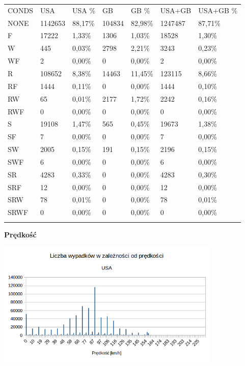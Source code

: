 \begin{longtable}[c]{@{}lllllll@{}}
\toprule\addlinespace
CONDS & USA & USA \% & GB & GB \% & USA+GB & USA+GB \%
\\\addlinespace
\midrule\endhead
NONE & 1142653 & 88,17\% & 104834 & 82,98\% & 1247487 & 87,71\%
\\\addlinespace
F & 17222 & 1,33\% & 1306 & 1,03\% & 18528 & 1,30\%
\\\addlinespace
W & 445 & 0,03\% & 2798 & 2,21\% & 3243 & 0,23\%
\\\addlinespace
WF & 2 & 0,00\% & 0 & 0,00\% & 2 & 0,00\%
\\\addlinespace
R & 108652 & 8,38\% & 14463 & 11,45\% & 123115 & 8,66\%
\\\addlinespace
RF & 1444 & 0,11\% & 0 & 0,00\% & 1444 & 0,10\%
\\\addlinespace
RW & 65 & 0,01\% & 2177 & 1,72\% & 2242 & 0,16\%
\\\addlinespace
RWF & 0 & 0,00\% & 0 & 0,00\% & 0 & 0,00\%
\\\addlinespace
S & 19108 & 1,47\% & 565 & 0,45\% & 19673 & 1,38\%
\\\addlinespace
SF & 7 & 0,00\% & 0 & 0,00\% & 7 & 0,00\%
\\\addlinespace
SW & 2005 & 0,15\% & 191 & 0,15\% & 2196 & 0,15\%
\\\addlinespace
SWF & 6 & 0,00\% & 0 & 0,00\% & 6 & 0,00\%
\\\addlinespace
SR & 4283 & 0,33\% & 0 & 0,00\% & 4283 & 0,30\%
\\\addlinespace
SRF & 12 & 0,00\% & 0 & 0,00\% & 12 & 0,00\%
\\\addlinespace
SRW & 78 & 0,01\% & 0 & 0,00\% & 78 & 0,01\%
\\\addlinespace
SRWF & 0 & 0,00\% & 0 & 0,00\% & 0 & 0,00\%
\\\addlinespace
\bottomrule
\end{longtable}

\textbf{Prędkość}

\centerline{\includegraphics[width=0.8\textwidth]{images/hipotheses/speed/speed.png}}

